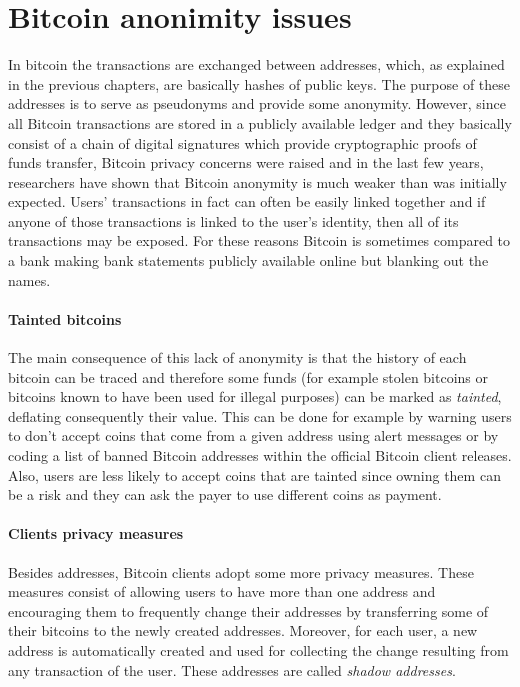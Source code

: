 \section{Bitcoin anonimity issues} In bitcoin the transactions are exchanged
between addresses, which, as explained in the previous chapters, are basically
hashes of public keys. The purpose of these addresses is to serve as pseudonyms
and provide some anonymity. However, since all Bitcoin transactions are stored
in a publicly available ledger and they basically consist of a chain of
digital signatures which provide cryptographic proofs of funds transfer, Bitcoin
privacy concerns were raised and in the last few years, researchers have shown
that Bitcoin anonymity is much weaker than was initially expected. Users’
transactions in fact can often be easily linked together and if anyone of those
transactions is linked to the user’s identity, then all of its transactions may
be exposed. For these reasons Bitcoin is sometimes compared to a bank making
bank statements publicly available online but blanking out the names.

\paragraph{Tainted bitcoins} The main consequence of this lack of anonymity is
that the history of each bitcoin can be traced and therefore some funds (for example
stolen bitcoins or bitcoins known to have been used for illegal purposes) can be
marked as \emph{tainted}, deflating consequently their value.  This can be done
for example by warning users to don't accept coins that come from a given
address using alert messages or by coding a list of banned Bitcoin addresses
within the official Bitcoin client releases. Also, users are less likely to
accept coins that are tainted since owning them  can be a risk and they can ask
the payer to use different coins as payment.


\paragraph{Clients privacy measures} Besides addresses, Bitcoin clients
adopt some more privacy measures. These measures consist of allowing users to
have more than one address and encouraging them to frequently change their
addresses by transferring some of their bitcoins to the newly created addresses.
Moreover, for each user, a new address is automatically created and used for
collecting the change resulting from any transaction of the user. These
addresses are called \emph{shadow addresses}.







